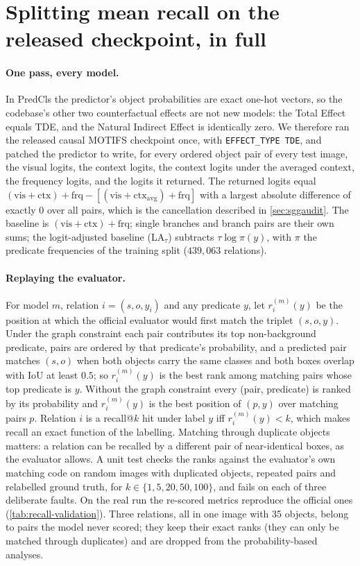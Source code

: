 \section{Splitting mean recall on the released checkpoint, in full}\label{app:recall}

\paragraph{One pass, every model.} In PredCls the predictor's object probabilities are exact
one-hot vectors, so the codebase's other two counterfactual effects are not new models:
the Total Effect equals TDE, and the Natural Indirect Effect is identically zero. We therefore
ran the released causal MOTIFS checkpoint once, with \texttt{EFFECT\_TYPE TDE}, and patched
the predictor to write, for every ordered object pair of every test image, the visual
logits, the context logits, the context logits under the averaged context, the frequency
logits, and the logits it returned. The returned logits equal
$(\mathrm{vis}+\mathrm{ctx})+\mathrm{frq}-[(\mathrm{vis}+\mathrm{ctx}_{\mathrm{avg}})+\mathrm{frq}]$
with a largest absolute difference of exactly $0$ over all pairs, which is the cancellation
described in \cref{sec:sggaudit}. The baseline is $(\mathrm{vis}+\mathrm{ctx})+\mathrm{frq}$;
single branches and branch pairs are their own sums; the logit-adjusted baseline (LA$_\tau$)
subtracts $\tau\log\pi(y)$, with $\pi$ the predicate frequencies of the training split
($439{,}063$ relations).

\paragraph{Replaying the evaluator.} For model $m$, relation $i=(s,o,y_i)$ and any predicate
$y$, let $r^{(m)}_i(y)$ be the position at which the official evaluator would first match the
triplet $(s,o,y)$. Under the graph constraint each pair contributes its top non-background
predicate, pairs are ordered by that predicate's probability, and a predicted pair matches
$(s,o)$ when both objects carry the same classes and both boxes overlap with IoU at least
$0.5$; so $r^{(m)}_i(y)$ is the best rank among matching pairs whose top predicate is $y$.
Without the graph constraint every (pair, predicate) is ranked by its probability and
$r^{(m)}_i(y)$ is the best position of $(p,y)$ over matching pairs $p$. Relation $i$ is a
recall@$k$ hit under label $y$ iff $r^{(m)}_i(y)<k$, which makes recall an exact function of
the labelling. Matching through duplicate objects matters: a relation can be recalled by a
different pair of near-identical boxes, as the evaluator allows. A unit test checks the ranks
against the evaluator's own matching code on random images with duplicated objects,
repeated pairs and relabelled ground truth, for $k\in\{1,5,20,50,100\}$, and fails on each of
three deliberate faults. On the real run the re-scored metrics reproduce the official ones
(\cref{tab:recall-validation}). Three relations, all in one image with 35 objects, belong to
pairs the model never scored; they keep their exact ranks (they can only be matched through
duplicates) and are dropped from the probability-based analyses.

